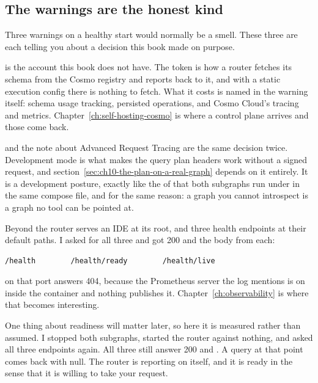 \subsection*{The warnings are the honest kind}

Three warnings on a healthy start would normally be a smell. These three are
each telling you about a decision this book made on purpose.

%
 is the account this book does not have. The
token is how a router fetches its schema from the Cosmo registry and reports
back to it, and with a static execution config there is nothing to fetch. What
it costs is named in the warning itself: schema usage tracking, persisted
operations, and Cosmo Cloud's tracing and metrics.
Chapter~\ref{ch:self-hosting-cosmo} is where a control plane arrives and those
come back.

 and the note about Advanced Request Tracing are
the same decision twice. Development mode is what makes the query plan headers
work without a signed request, and
section~\ref{sec:ch10-the-plan-on-a-real-graph} depends on it entirely. It is
a development posture, exactly like the  of
 that both subgraphs run under in the same compose file, and
for the same reason: a graph you cannot introspect is a graph no tool can be
pointed at.

\medskip
{}%
Beyond  the router serves an IDE at its root, and three health
endpoints at their default paths. I asked for all three and got 200 and the
body  from each:

\begin{verbatim}
/health        /health/ready        /health/live
\end{verbatim}

 on that port answers 404, because the Prometheus server the log
mentions is on  inside the container and nothing publishes
it. Chapter~\ref{ch:observability} is where that becomes interesting.

%
One thing about readiness will matter later, so here it is measured rather than
assumed. I stopped both subgraphs, started the router against nothing, and
asked all three endpoints again. All three still answer 200 and . A
query at that point comes back
 with  null. The
router is reporting on itself, and it is ready in the sense that it is willing
to take your request.

%
